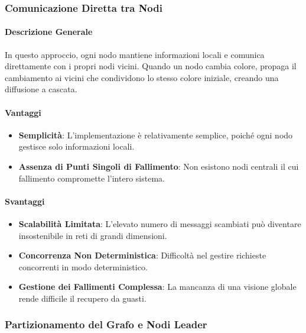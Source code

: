 \documentclass[12pt, a4paper]{report}
\begin{document}
\subsubsection{Comunicazione Diretta tra Nodi}

\paragraph{Descrizione Generale}

In questo approccio, ogni nodo mantiene informazioni locali e comunica direttamente con i propri nodi vicini. Quando un nodo cambia colore, propaga il cambiamento ai vicini che condividono lo stesso colore iniziale, creando una diffusione a cascata.

\paragraph{Vantaggi}

\begin{itemize}
    \item \textbf{Semplicità}: L'implementazione è relativamente semplice, poiché ogni nodo gestisce solo informazioni locali.
    \item \textbf{Assenza di Punti Singoli di Fallimento}: Non esistono nodi centrali il cui fallimento compromette l'intero sistema.
\end{itemize}

\paragraph{Svantaggi}

\begin{itemize}
    \item \textbf{Scalabilità Limitata}: L'elevato numero di messaggi scambiati può diventare insostenibile in reti di grandi dimensioni.
    \item \textbf{Concorrenza Non Deterministica}: Difficoltà nel gestire richieste concorrenti in modo deterministico.
    \item \textbf{Gestione dei Fallimenti Complessa}: La mancanza di una visione globale rende difficile il recupero da guasti.
\end{itemize}

\subsubsection{Partizionamento del Grafo e Nodi Leader}
\end{document}
